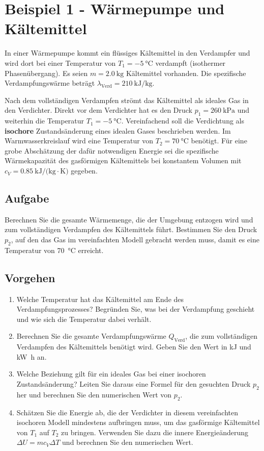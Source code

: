 \documentclass[11pt, a4paper]{article}
\begin{document}
\newpage

\section*{Beispiel 1 - Wärmepumpe und Kältemittel}

In einer Wärmepumpe kommt ein flüssiges Kältemittel in den Verdampfer und wird dort bei einer Temperatur von $T_1 = \SI{-5}{\degreeCelsius}$ verdampft (isothermer Phasenübergang). Es seien $m = \SI{2.0}{\kilogram}$ Kältemittel vorhanden. Die spezifische Verdampfungswärme beträgt $\lambda_{\text{Verd}} = \SI{210}{\kilo\joule\per\kilogram}$.

Nach dem vollständigen Verdampfen strömt das Kältemittel als ideales Gas in den Verdichter. Direkt vor dem Verdichter hat es den Druck $p_1 = \SI{260}{\kilo\pascal}$ und weiterhin die Temperatur $T_1 = \SI{-5}{\degreeCelsius}$. Vereinfachend soll die Verdichtung als \textbf{isochore} Zustandsänderung eines idealen Gases beschrieben werden. Im Warmwasserkreislauf wird eine Temperatur von $T_2 = \SI{70}{\degreeCelsius}$ benötigt. Für eine grobe Abschätzung der dafür notwendigen Energie sei die spezifische Wärmekapazität des gasförmigen Kältemittels bei konstantem Volumen mit $c_V = \SI{0.85}{\kilo\joule\per(\kilogram\cdot\kelvin)}$ gegeben.

\subsection*{Aufgabe}
Berechnen Sie die gesamte Wärmemenge, die der Umgebung entzogen wird und zum vollständigen Verdampfen des Kältemittels führt. Bestimmen Sie den Druck $p_2$, auf den das Gas im vereinfachten Modell gebracht werden muss, damit es eine Temperatur von \SI{70}{\degreeCelsius} erreicht.

\subsection*{Vorgehen}
\begin{enumerate}
    \item Welche Temperatur hat das Kältemittel am Ende des Verdampfungsprozesses? Begründen Sie, was bei der Verdampfung geschieht und wie sich die Temperatur dabei verhält.
    \item Berechnen Sie die gesamte Verdampfungswärme $Q_{\text{Verd}}$, die zum vollständigen Verdampfen des Kältemittels benötigt wird. Geben Sie den Wert in \si{\kilo\joule} und \si{\kilo\watt\hour} an.
    \item Welche Beziehung gilt für ein ideales Gas bei einer isochoren Zustandsänderung? Leiten Sie daraus eine Formel für den gesuchten Druck $p_2$ her und berechnen Sie den numerischen Wert von $p_2$.
    \item Sch\"atzen Sie die Energie ab, die der Verdichter in diesem vereinfachten isochoren Modell mindestens aufbringen muss, um das gasf\"ormige K\"altemittel von $T_1$ auf $T_2$ zu bringen. Verwenden Sie dazu die innere Energie\"anderung $\Delta U = m c_V \Delta T$ und berechnen Sie den numerischen Wert.
\end{enumerate}
\end{document}
